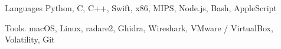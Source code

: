 
\begin{cvskills}

	\cvskill
	{Languages} %
	{Python, C, C++, Swift, x86, MIPS, Node.js, Bash, AppleScript} %

	\cvskill
	{Tools\hphantom{25}\color{white}.\hphantom{25}} %
	{macOS, Linux, radare2, Ghidra, Wireshark, VMware / VirtualBox, Volatility, Git} %

\end{cvskills}
